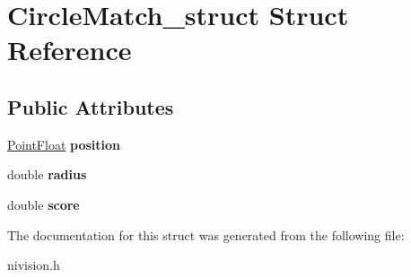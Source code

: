 \hypertarget{structCircleMatch__struct}{\section{\-Circle\-Match\-\_\-struct \-Struct \-Reference}
\label{structCircleMatch__struct}
}
\subsection*{\-Public \-Attributes}
\begin{DoxyCompactItemize}
\item 
\hypertarget{structCircleMatch__struct_a8aedec4e005e969297bde199172173f1}{\hyperlink{structPointFloat__struct}{\-Point\-Float} {\bfseries position}}\label{structCircleMatch__struct_a8aedec4e005e969297bde199172173f1}

\item 
\hypertarget{structCircleMatch__struct_ab69779b888dbd1e9cb5866424cdecb83}{double {\bfseries radius}}\label{structCircleMatch__struct_ab69779b888dbd1e9cb5866424cdecb83}

\item 
\hypertarget{structCircleMatch__struct_af70be7888141e0d652284a1a3a327296}{double {\bfseries score}}\label{structCircleMatch__struct_af70be7888141e0d652284a1a3a327296}

\end{DoxyCompactItemize}


\-The documentation for this struct was generated from the following file\-:\begin{DoxyCompactItemize}
\item 
nivision.\-h\end{DoxyCompactItemize}

